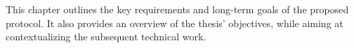 This chapter outlines the key requirements and long-term goals of the proposed \pol{} protocol. It also provides an overview of the thesis' objectives, while aiming at contextualizing the subsequent technical work.